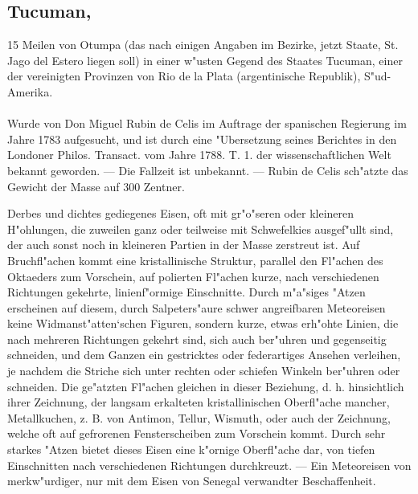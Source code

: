 \documentclass[a4paper, 11pt, oneside, polutonikogreek, german]{article}
\begin{document}
\setlength{\leftskip}{0pt}
\setlength{\parindent}{20pt}

\subsection[Tucuman.]{Tucuman,}
\begin{center}
\small
15 Meilen von Otumpa (das nach einigen Angaben im Bezirke, jetzt Staate, St. Jago del Estero liegen soll) in einer w"usten Gegend des Staates Tucuman, einer der vereinigten Provinzen von Rio de la Plata (argentinische Republik), S"ud-Amerika.
\end{center}
\paragraph{}
Wurde von Don Miguel Rubin de Celis im Auftrage der spanischen Regierung im Jahre 1783 aufgesucht, und ist durch eine "Ubersetzung seines Berichtes in den Londoner Philos. Transact. vom Jahre 1788. T. 1. der wissenschaftlichen Welt bekannt geworden. --- Die Fallzeit ist unbekannt. --- Rubin de Celis sch"atzte das Gewicht der Masse auf 300 Zentner.

Derbes und dichtes gediegenes Eisen, oft mit gr"o"seren oder kleineren H"ohlungen, die zuweilen ganz oder teilweise mit Schwefelkies ausgef"ullt sind, der auch sonst noch in kleineren Partien in der Masse zerstreut ist. Auf Bruchfl"achen kommt eine kristallinische Struktur, parallel den Fl"achen des Oktaeders zum Vorschein, auf polierten Fl"achen kurze, nach verschiedenen Richtungen gekehrte, linienf"ormige Einschnitte. Durch m"a"siges "Atzen erscheinen auf diesem, durch Salpeters"aure schwer angreifbaren Meteoreisen keine Widmanst"atten‘schen Figuren, sondern kurze, etwas erh"ohte Linien, die nach mehreren Richtungen gekehrt sind, sich auch ber"uhren und gegenseitig schneiden, und dem Ganzen ein gestricktes oder federartiges Ansehen verleihen, je nachdem die Striche sich unter rechten oder schiefen Winkeln ber"uhren oder schneiden. Die ge"atzten Fl"achen gleichen in dieser Beziehung, d. h. hinsichtlich ihrer Zeichnung, der langsam erkalteten kristallinischen Oberfl"ache mancher, Metallkuchen, z. B. von Antimon, Tellur, Wismuth, oder auch der Zeichnung, welche oft auf gefrorenen Fensterscheiben zum Vorschein kommt. Durch sehr starkes "Atzen bietet dieses Eisen eine k"ornige Oberfl"ache dar, von tiefen Einschnitten nach verschiedenen Richtungen durchkreuzt. --- Ein Meteoreisen von merkw"urdiger, nur mit dem Eisen von Senegal verwandter Beschaffenheit.
\end{document}
